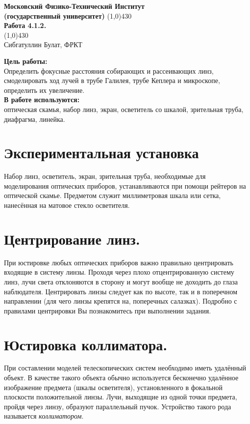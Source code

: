 \documentclass[a4paper, 12pt]{article}%
\begin{document}
\begin{titlepage}

\begin{center}
\large\textbf{Московский Физико-Технический Институт}\\
\large\textbf{(государственный университет)}
\vfill
\line(1,0){430}\\[1mm]
\huge\textbf{Работа 4.1.2.}\\
\line(1,0){430}\\[1mm]
\vfill
\large Сибгатуллин Булат, ФРКТ\\
\end{center}

\end{titlepage}
\noindent \textbf{Цель работы:} \\
\indent Определить фокусные расстояния собирающих и рассеивающих линз, смоделировать ход лучей в трубе Галилея, трубе Кеплера и микроскопе, определить их увеличение.\\
\noindent \textbf{В работе используются:} \\
\indent оптическая скамья, набор линз, экран, осветитель со шкалой, зрительная труба, диафрагма, линейка.

\section*{Экспериментальная установка}

Набор линз, осветитель, экран, зрительная труба, необходимые для моделирования оптических приборов, устанавливаются при помощи рейтеров на оптической скамье. Предметом служит
	миллиметровая шкала или сетка, нанесённая на матовое стекло осветителя.
	
	\section*{Центрирование линз.} При юстировке любых оптических приборов важно правильно центрировать входящие в систему линзы. Проходя через плохо
	отцентрированную систему линз, лучи света отклоняются в сторону и могут
	вообще не доходить до глаза наблюдателя. Центрировать линзы следует как
	по высоте, так и в поперечном направлении (для чего линзы крепятся на, поперечных салазках). Подробно с правилами центрировки Вы познакомитесь
	при выполнении задания.
	
	\section*{Юстировка коллиматора.} При составлении моделей телескопических
	систем необходимо иметь удалённый объект. В качестве такого объекта обычно используется бесконечно удалённое изображение предмета (шкалы осветителя), установленного в фокальной плоскости положительной линзы. Лучи,
	выходящие из одной точки предмета, пройдя через линзу, образуют параллельный пучок. Устройство такого рода называется \textit{коллиматором}.
\end{document}
